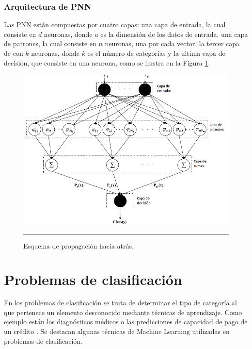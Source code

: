 \documentclass[11pt,titlepage]{report}
\begin{document}
\subsubsection{Arquitectura de PNN}
Las PNN están compuestas por cuatro capas: una capa de entrada, la cual consiste en $d$ neuronas, donde $a$ es la dimensión de los datos de entrada, una capa de patrones, la cual consiste en $n$ neuronas,
una por cada vector, la tercer capa de con $k$ neuronas, donde $k$ es el número de categorías y la ultima capa de decisión, que consiste en una neurona, como se ilustra en la Figura \ref{05}.

\begin{figure}[h]
	\centering
	\includegraphics[scale=0.6]{Pic/RedPNN}
	\caption{Esquema de propagación hacia atrás.\cite{Art15}}
	\label{05}
	\hrule
\end{figure}

\section{Problemas de clasificación}
En los problemas de clasificación se trata de determinar el tipo de categoría al que pertenece un elemento desconocido mediante técnicas de aprendizaje. Como ejemplo están los diagnósticos médicos o las predicciones de capacidad de pago de un crédito \cite{Guia17}. Se destacan algunas técnicas de Machine Learning utilizadas en problemas de clasificación.
\end{document}
